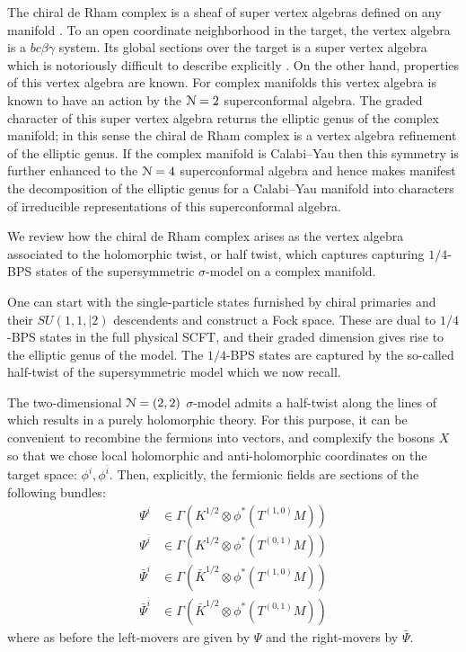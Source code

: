 \documentclass[../main.tex]{subfiles}
\begin{document}
The chiral de Rham complex is a sheaf of super vertex algebras defined on any manifold \cite{Malikovetal}.
To an open coordinate neighborhood in the target, the vertex algebra is a $bc\beta\gamma$ system.
Its global sections over the target is a super vertex algebra which is notoriously difficult to describe explicitly \cite{Moonshine stuff?}.
On the other hand, properties of this vertex algebra are known.
For complex manifolds this vertex algebra is known to have an action by the $\mathcal{N}=2$ superconformal algebra.
The graded character of this super vertex algebra returns the elliptic genus of the complex manifold; in this sense the chiral de Rham complex is a vertex algebra refinement of the elliptic genus.
If the complex manifold is Calabi--Yau then this symmetry is further enhanced to the $\mathcal{N}=4$ superconformal algebra and hence makes manifest the decomposition of the elliptic genus for a Calabi--Yau manifold into characters of irreducible representations of this superconformal algebra.


We review how the chiral de Rham complex arises as the vertex algebra associated to the holomorphic twist, or half twist, which captures capturing $1/4$-BPS states of the supersymmetric $\sigma$-model on a complex manifold.

One can start with the single-particle states furnished by chiral primaries and their $SU(1,1,|2)$ descendents and construct a Fock space. 
These are dual to $1/4$-BPS states in the full physical SCFT, and their graded dimension gives rise to the elliptic genus of the model.
The $1/4$-BPS states are captured by the so-called half-twist of the supersymmetric model which we now recall.

The two-dimensional $\mathcal{N}=(2,2)$ $\sigma$-model admits a half-twist along the lines of \cite{Kapustin, Witten} which results in a purely holomorphic theory.
For this purpose, it can be convenient to recombine the fermions into vectors, and complexify the bosons $X$ so that we chose local holomorphic and anti-holomorphic coordinates on the target space: $\phi^i, \phi^{\bar{i}}$. 
Then, explicitly, the fermionic fields are sections of the following bundles: 
\begin{align*}
\Psi^i &\in \Gamma(K^{1/2}\otimes \phi^*(T^{(1,0)}M))\\
\Psi^{\bar{i}}&\in \Gamma(K^{1/2}\otimes \phi^*(T^{(0,1)}M))\\
\bar{\Psi}^{i} &\in \Gamma(\bar{K}^{1/2}\otimes \phi^*(T^{(1,0)}M))\\
\bar{\Psi}^{\bar{i}} &\in \Gamma(\bar{K}^{1/2}\otimes \phi^*(T^{(0,1)}M))
\end{align*}  
where as before the left-movers are given by $\Psi$ and the right-movers by $\bar{\Psi}$.
\end{document}
